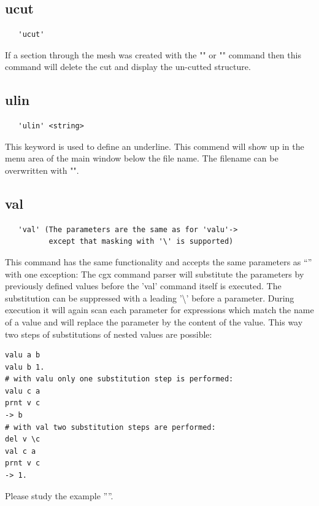 \documentclass{article}
\begin{document}
\subsection{\label{ucut}ucut}
\begin{verbatim}
   'ucut'
\end{verbatim}
If a section through the mesh was created with the "" or "" command then this command will delete the cut and display the un-cutted structure.

\subsection{\label{ulin}ulin}
\begin{verbatim}
   'ulin' <string> 
\end{verbatim}
This keyword is used to define an underline. This commend will show up in the
menu area of the main window below the file name. The filename can be overwritten with "".

\subsection{\label{val}val}
\begin{verbatim}
   'val' (The parameters are the same as for 'valu'->
          except that masking with '\' is supported)
\end{verbatim}
This command has the same functionality and accepts the same parameters as ``'' with one exception: The cgx command parser will substitute the parameters by previously defined values before the 'val' command itself is executed. The substitution can be suppressed with a leading '\textbackslash{}' before a parameter. During execution it will again scan each parameter for expressions which match the name of a value and will replace the parameter by the content of the value. This way two steps of substitutions of nested values are possible:
\begin{verbatim}
valu a b
valu b 1.
# with valu only one substitution step is performed:
valu c a
prnt v c
-> b
# with val two substitution steps are performed:
del v \c
val c a
prnt v c
-> 1.
\end{verbatim}
Please study the example ''''.
\end{document}
